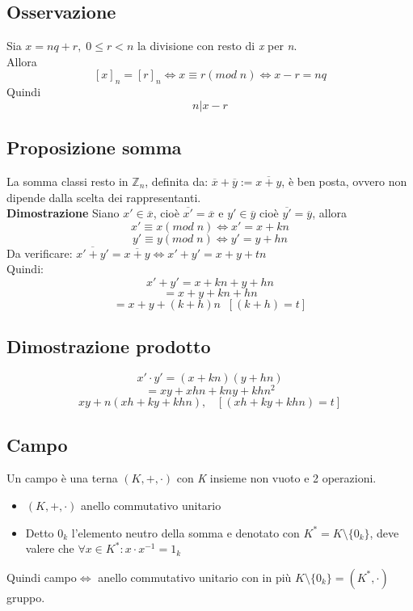 \subsection{Osservazione}
Sia \(x=nq+r,\;0\leq r<n\) la divisione con resto di \textit{x} per \textit{n}.\\
Allora \[[x]_n=[r]_n\Leftrightarrow x\equiv r(mod\;n)\Leftrightarrow x-r=nq\]
Quindi \[n|x-r\]

\subsection{Proposizione somma}
La somma classi resto in \(\mathbb{Z}_n\), definita da: \(\overline{x}+\overline{y}:= \overline{x+y}\), è ben posta, ovvero non dipende dalla scelta dei rappresentanti.
\\
\textbf{Dimostrazione}
Siano \(x'\in\overline{x}\), cioè \(\overline{x'}=\overline{x}\) e \(y'\in\overline{y}\) cioè \(\overline{y'}=\overline{y}\), allora\\
\[x'\equiv x(mod\;n)\Leftrightarrow x'=x+kn\]
\[y'\equiv y(mod\;n)\Leftrightarrow y'=y+hn\]
Da verificare: \(\overline{x'+y'}=\overline{x+y}\Leftrightarrow x'+y'=x+y+tn\)
\\Quindi:
\[x'+y'=x+kn+y+hn\]
\[=x+y+kn+hn\]
\[=x+y+(k+h)n\;\;[(k+h)=t]\]

\subsection{Dimostrazione prodotto}
\[x'\cdot y'= (x+kn)(y+hn)\]
\[=xy+xhn+kny+khn^2\]
\[xy+n(xh+ky+khn),\;\;\;[(xh+ky+khn)=t]\]

\subsection{Campo}
Un campo è una terna \((K,+,\cdot)\) con \textit{K} insieme non vuoto e 2 operazioni.
\begin{itemize}
    \item \((K,+,\cdot)\) anello commutativo unitario
    \item Detto \(0_k\) l'elemento neutro della somma e denotato con \(K^*=K\setminus\{0_k\}\), deve valere che \(\forall x\in K^*:x\cdot x^{-1}=1_k\)
\end{itemize}
Quindi campo\(\Leftrightarrow\) anello commutativo unitario con in più \(K\setminus\{0_k\}=(K^*,\cdot)\) gruppo.

